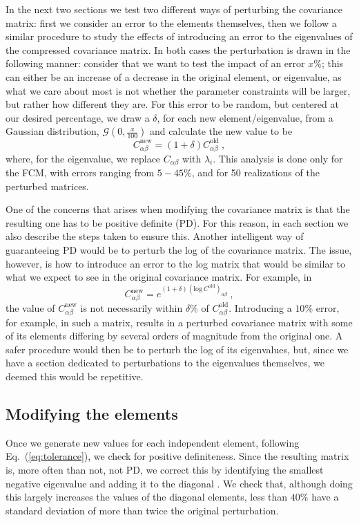 \documentclass[twocolumn,nofootinbib]{\docclass}
\newcommand{\ec}[1]{Eq.~(\ref{eq:#1})}
\newcommand\be{\begin{equation}}
\newcommand\ee{\end{equation}}
\newcommand\full{the FCM}
\begin{document}
In the next two sections we test two different ways of perturbing the covariance matrix: first we consider an error to the elements themselves, then we follow a similar procedure to study the effects of introducing an error to the eigenvalues of the compressed covariance matrix. In both cases the perturbation is drawn in the following manner: consider that we want to test the impact of an error $x \%$; this can either be an increase of a decrease in the original element, or eigenvalue, as what we care about most is not whether the parameter constraints will be larger, but rather how different they are. For this error to be random, but centered at our desired percentage, we draw a $\delta$, for each new element/eigenvalue, from a Gaussian distribution, $\mathcal{G}(0,\frac{x}{100})$ and calculate the new value to be
\be \label{eq:tolerance}
C_{\alpha \beta}^{\text{new}} = (1 + \delta)C_{\alpha \beta}^{\text{old}}\ 
,\ee
where, for the eigenvalue, we replace $C_{\alpha \beta}$ with $\lambda_i$. This analysis is done only for \full, with errors ranging from $5 - 45 \%$, and for 50 realizations of the perturbed matrices.


One of the concerns that arises when modifying the covariance matrix is that the resulting one has to be positive definite (PD). For this reason, in each section we also describe the steps taken to ensure this. Another intelligent way of guaranteeing PD would be to perturb the log of the covariance matrix. The issue, however, is how to introduce an error to the log matrix that would be similar to what we expect to see in the original covariance matrix. For example, in
	\be
	C_{\alpha \beta}^{\text{new}} = e^{(1 + \delta)(\text{log}\ C^{\text{old}})_{\alpha \beta}}\ 
	,\ee
	the value of $C_{\alpha \beta}^{\text{new}}$ is not necessarily within $\delta \%$ of $C_{\alpha \beta}^{\text{old}}$. Introducing a $10\%$ error, for example, in such a matrix, results in a perturbed covariance matrix with some of its elements differing by several orders of magnitude from the original one. A safer procedure would then be to perturb the log of its eigenvalues, but, since we have a section dedicated to perturbations to the eigenvalues themselves, we deemed this would be repetitive.

\subsection{Modifying the elements}

Once we generate new values for each independent element, following \ec{tolerance}, we check for positive definiteness. Since the resulting matrix is, more often than not, not PD, we correct this by identifying the smallest negative eigenvalue and adding it to the diagonal \cite{Yuan:2008}. We check that, although doing this largely increases the values of the diagonal elements, less than $40 \%$ have a standard deviation of more than twice the original perturbation. 
\end{document}
